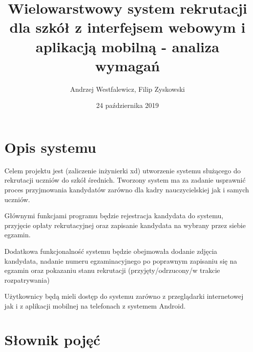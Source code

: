 \documentclass{article}
\title{Wielowarstwowy system rekrutacji dla szkół z interfejsem webowym i aplikacją mobilną - analiza wymagań}
\author{Andrzej Westfalewicz, Filip Zyskowski}
\date{24 października 2019}
\begin{document}
\begin{titlepage}
\maketitle
\end{titlepage}

\tableofcontents

\section{Opis systemu}

Celem projektu jest (zaliczenie inżynierki xd) utworzenie systemu służącego do rekrutacji uczniów do szkół średnich. Tworzony system ma za zadanie usprawnić proces przyjmowania kandydatów zarówno dla kadry nauczycielskiej jak i samych uczniów.

Głównymi funkcjami programu będzie rejestracja kandydata do systemu, przyjęcie opłaty rekrutacyjnej oraz zapisanie kandydata na wybrany przez siebie egzamin.

Dodatkowa funkcjonalność systemu będzie obejmowała dodanie zdjęcia kandydata, nadanie numeru egzaminacyjnego po poprawnym zapisaniu się na egzamin oraz pokazaniu stanu rekrutacji (przyjęty/odrzucony/w trakcie rozpatrywania)

Użytkownicy będą mieli dostęp do systemu zarówno z przeglądarki internetowej jak i z aplikacji mobilnej na telefonach z systemem Android.

\section{Słownik pojęć}
\end{document}
